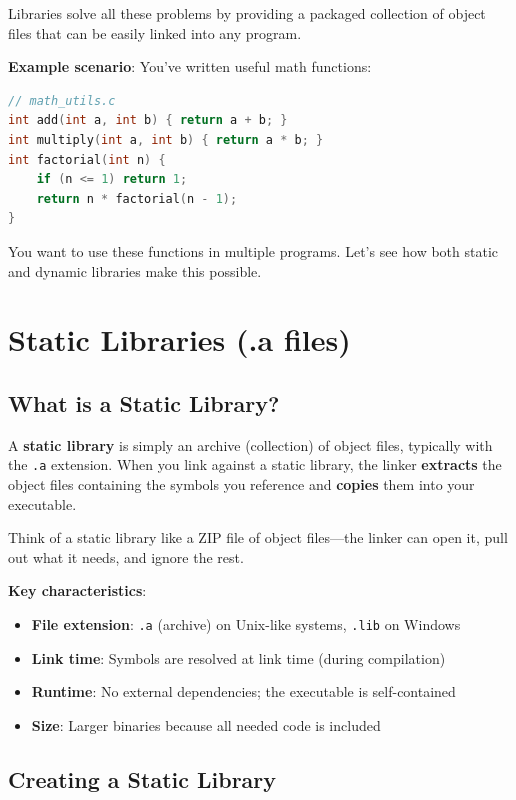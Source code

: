 Libraries solve all these problems by providing a packaged collection of object files that can be easily linked into any program.

\textbf{Example scenario}: You've written useful math functions:

\begin{lstlisting}[language=C]
// math_utils.c
int add(int a, int b) { return a + b; }
int multiply(int a, int b) { return a * b; }
int factorial(int n) {
    if (n <= 1) return 1;
    return n * factorial(n - 1);
}
\end{lstlisting}

You want to use these functions in multiple programs. Let's see how both static and dynamic libraries make this possible.

\section{Static Libraries (.a files)}

\subsection{What is a Static Library?}

A \textbf{static library} is simply an archive (collection) of object files, typically with the \texttt{.a} extension. When you link against a static library, the linker \textbf{extracts} the object files containing the symbols you reference and \textbf{copies} them into your executable.

Think of a static library like a ZIP file of object files—the linker can open it, pull out what it needs, and ignore the rest.

\textbf{Key characteristics}:
\begin{itemize}
    \item \textbf{File extension}: \texttt{.a} (archive) on Unix-like systems, \texttt{.lib} on Windows
    \item \textbf{Link time}: Symbols are resolved at link time (during compilation)
    \item \textbf{Runtime}: No external dependencies; the executable is self-contained
    \item \textbf{Size}: Larger binaries because all needed code is included
\end{itemize}

\subsection{Creating a Static Library}

